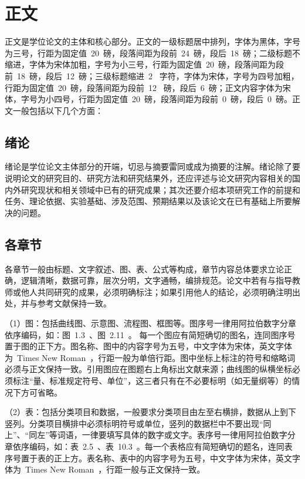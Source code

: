 \section{正文}

正文是学位论文的主体和核心部分。正文的一级标题居中排列，字体为黑体，字号为三号，行距为固定值~20~磅，段落间距为段前~24~磅，段后~18~磅；二级标题不缩进，字体为宋体加粗，字号为小三号，行距为固定值~20~磅，段落间距为段前~18~磅，段后~12~磅；三级标题缩进~2~ 字符，字体为宋体，字号为四号加粗，行距为固定值~20~磅，段落间距为段前~12~ 磅，段后~6~磅；正文内容字体为宋体，字号为小四号，行距为固定值~20~磅，段落间距为段前~0~磅，段后~0~磅。正文一般包括以下几个方面：

\subsection{绪论}

绪论是学位论文主体部分的开端，切忌与摘要雷同或成为摘要的注解。绪论除了要说明论文的研究目的、研究方法和研究结果外，还应评述与论文研究内容相关的国内外研究现状和相关领域中已有的研究成果；其次还要介绍本项研究工作的前提和任务、理论依据、实验基础、涉及范围、预期结果以及该论文在已有基础上所要解决的问题。

\subsection{各章节}

各章节一般由标题、文字叙述、图、表、公式等构成，章节内容总体要求立论正确，逻辑清晰，数据可靠，层次分明，文字通畅，编排规范。论文中若有与指导教师或他人共同研究的成果，必须明确标注；如果引用他人的结论，必须明确注明出处，并与参考文献保持一致。

（1）图：包括曲线图、示意图、流程图、框图等。图序号一律用阿拉伯数字分章依序编码，如：图~1.3~、图~2.11~。 每一个图应有简短确切的图名，连同图序号置于图的正下方。图名称、图中的内容字号为五号，中文字体为宋体，英文字体为~Times New Roman~，行距一般为单倍行距。图中坐标上标注的符号和缩略词必须与正文保持一致。引用图应在图题右上角标出文献来源；曲线图的纵横坐标必须标注“量、标准规定符号、单位”，这三者只有在不必要标明（如无量纲等）的情况下方可省略。

（2）表：包括分类项目和数据，一般要求分类项目由左至右横排，数据从上到下竖列。分类项目横排中必须标明符号或单位，竖列的数据栏中不要出现“同上”、“同左”等词语，一律要填写具体的数字或文字。表序号一律用阿拉伯数字分章依序编码，如：表~2.5~、表~10.3~。每一个表格应有简短确切的题名，连同表序号置于表的正上方。表名称、表中的内容字号为五号，中文字体为宋体，英文字体为~Times New Roman~，行距一般与正文保持一致。

